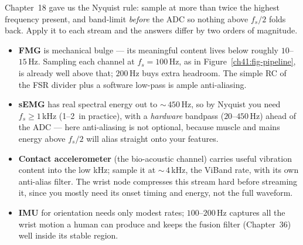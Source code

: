 Chapter~18 gave us the Nyquist rule: sample at more than twice the highest
frequency present, and band-limit \emph{before} the ADC so nothing above
$f_s/2$ folds back. Apply it to each stream and the answers differ by two orders
of magnitude.

\begin{itemize}
  \item \textbf{FMG} is mechanical bulge --- its meaningful content lives below
        roughly $10$--$15\,$Hz. Sampling each channel at $f_s = 100\,$Hz, as in
        Figure~\ref{ch41:fig-pipeline}, is already well above that; $200\,$Hz buys
        extra headroom. The simple RC of the FSR divider
        plus a software low-pass is ample anti-aliasing.
  \item \textbf{sEMG} has real spectral energy out to $\sim$\,$450\,$Hz, so by
        Nyquist you need $f_s \ge 1\,$kHz (1--2\, in practice), with a
        \emph{hardware} bandpass ($20$--$450\,$Hz) ahead of the ADC --- here
        anti-aliasing is not optional, because muscle and mains energy above
        $f_s/2$ will alias straight onto your features.
  \item \textbf{Contact accelerometer} (the bio-acoustic channel) carries useful
        vibration content into the low kHz; sample it at $\sim$\,$4\,$kHz, the
        ViBand rate, with its own anti-alias filter. The wrist node compresses
        this stream hard before streaming it, since you mostly need its onset
        timing and energy, not the full waveform.
  \item \textbf{IMU} for orientation needs only modest rates; $100$--$200\,$Hz
        captures all the wrist motion a human can produce and keeps the fusion
        filter (Chapter~36) well inside its stable region.
\end{itemize}



